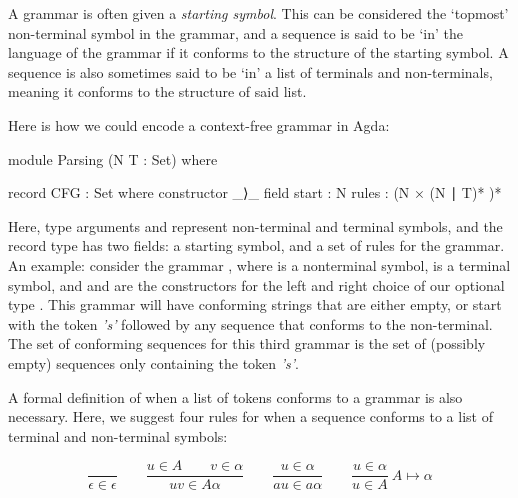 	A grammar is often given a \emph{starting symbol}. This can be considered
	the `topmost' non-terminal symbol in the grammar, and a sequence is said to
	be `in' the language of the grammar if it conforms to the structure
	of the starting symbol.  A sequence is also sometimes said to be `in' a
	list of terminals and non-terminals, meaning it conforms to the structure
	of said list.

	Here is how we could encode a context-free grammar in Agda:

	\begin{code}
		module Parsing (N T : Set) where

		record CFG : Set where
		  constructor _⟩_
		  field
		    start : N
		    rules : (N × (N ∣ T)* )*
	\end{code}

	Here, type arguments  and  represent non-terminal and
	terminal symbols, and the record type has two fields: a starting symbol,
	and a set of rules for the grammar.  An example: consider the grammar
	, where  is
	a nonterminal symbol,  is a terminal symbol, and  and
	 are the constructors for the left and right choice of our
	optional type . This grammar will have conforming strings that
	are either empty, or start with the token \emph{'s'} followed by any
	sequence that conforms to the  non-terminal. The set of
	conforming sequences for this third grammar is the set of (possibly empty)
	sequences only containing the token \emph{'s'}.


	A formal definition of when a list of tokens conforms to a grammar is also
	necessary. Here, we suggest four rules for when a sequence conforms to a
	list of terminal and non-terminal symbols: 

	\[
	\frac{\ }{\epsilon\in\epsilon} \qquad
	\frac{u\in A \qquad v\in\alpha}{uv\in A\alpha} \qquad
	\frac{u\in\alpha}{au\in a\alpha} \qquad
	\frac{u\in\alpha}{u\in A}\ A \mapsto \alpha
	\]


